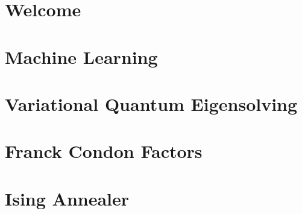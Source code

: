 \documentclass[12pt]{article}
\begin{document}
\thispagestyle{empty}
\section*{Welcome}

\newpage

\thispagestyle{empty}
\tableofcontents

\newpage

\section{Machine Learning}

\newpage

\section{Variational Quantum Eigensolving}

\newpage

\section{Franck Condon Factors}

\newpage

\section{Ising Annealer}

\newpage


\end{document}
